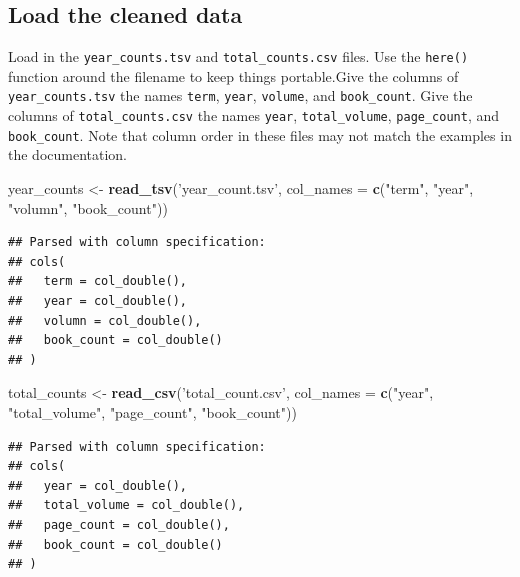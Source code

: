 \documentclass[
]{article}
\newenvironment{Shaded}{\begin{snugshade}}{\end{snugshade}}
\newcommand{\DataTypeTok}[1]{\textcolor[rgb]{0.13,0.29,0.53}{#1}}
\newcommand{\KeywordTok}[1]{\textcolor[rgb]{0.13,0.29,0.53}{\textbf{#1}}}
\newcommand{\NormalTok}[1]{#1}
\newcommand{\StringTok}[1]{\textcolor[rgb]{0.31,0.60,0.02}{#1}}
\begin{document}
\hypertarget{load-the-cleaned-data}{%
\subsection{Load the cleaned data}\label{load-the-cleaned-data}}

Load in the \texttt{year\_counts.tsv} and \texttt{total\_counts.csv}
files. Use the \texttt{here()} function around the filename to keep
things portable.Give the columns of \texttt{year\_counts.tsv} the names
\texttt{term}, \texttt{year}, \texttt{volume}, and \texttt{book\_count}.
Give the columns of \texttt{total\_counts.csv} the names \texttt{year},
\texttt{total\_volume}, \texttt{page\_count}, and \texttt{book\_count}.
Note that column order in these files may not match the examples in the
documentation.

\begin{Shaded}
\begin{Highlighting}[]
\NormalTok{year_counts <-}\StringTok{ }\KeywordTok{read_tsv}\NormalTok{(}\StringTok{'year_count.tsv'}\NormalTok{, }\DataTypeTok{col_names =} \KeywordTok{c}\NormalTok{(}\StringTok{"term"}\NormalTok{, }\StringTok{"year"}\NormalTok{, }\StringTok{"volumn"}\NormalTok{, }\StringTok{"book_count"}\NormalTok{))}
\end{Highlighting}
\end{Shaded}

\begin{verbatim}
## Parsed with column specification:
## cols(
##   term = col_double(),
##   year = col_double(),
##   volumn = col_double(),
##   book_count = col_double()
## )
\end{verbatim}

\begin{Shaded}
\begin{Highlighting}[]
\NormalTok{total_counts <-}\StringTok{ }\KeywordTok{read_csv}\NormalTok{(}\StringTok{'total_count.csv'}\NormalTok{, }\DataTypeTok{col_names =} \KeywordTok{c}\NormalTok{(}\StringTok{"year"}\NormalTok{, }\StringTok{"total_volume"}\NormalTok{, }\StringTok{"page_count"}\NormalTok{, }\StringTok{"book_count"}\NormalTok{))}
\end{Highlighting}
\end{Shaded}

\begin{verbatim}
## Parsed with column specification:
## cols(
##   year = col_double(),
##   total_volume = col_double(),
##   page_count = col_double(),
##   book_count = col_double()
## )
\end{verbatim}
\end{document}
